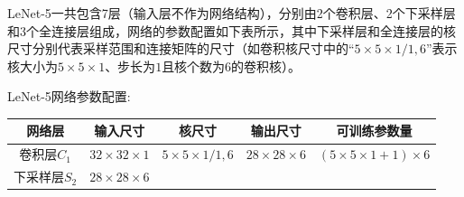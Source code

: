 \documentclass[12pt,a4paper,UTF8,twoside]{book}
\begin{document}
LeNet-5一共包含7层（输入层不作为网络结构），分别由2个卷积层、2个下采样层和3个全连接层组成，网络的参数配置如下表所示，其中下采样层和全连接层的核尺寸分别代表采样范围和连接矩阵的尺寸（如卷积核尺寸中的\(“5\times5\times1/1,6”\)表示核大小为\(5\times5\times1\)、步长为\(1\)且核个数为6的卷积核）。

LeNet-5网络参数配置:

\begin{longtable}[]{@{}ccccc@{}}
\toprule
\begin{minipage}[b]{0.12\columnwidth}\centering
网络层\strut
\end{minipage} & \begin{minipage}[b]{0.16\columnwidth}\centering
输入尺寸\strut
\end{minipage} & \begin{minipage}[b]{0.19\columnwidth}\centering
核尺寸\strut
\end{minipage} & \begin{minipage}[b]{0.16\columnwidth}\centering
输出尺寸\strut
\end{minipage} & \begin{minipage}[b]{0.24\columnwidth}\centering
可训练参数量\strut
\end{minipage}\tabularnewline
\midrule
\endhead
\begin{minipage}[t]{0.12\columnwidth}\centering
卷积层\(C_1\)\strut
\end{minipage} & \begin{minipage}[t]{0.16\columnwidth}\centering
\(32\times32\times1\)\strut
\end{minipage} & \begin{minipage}[t]{0.19\columnwidth}\centering
\(5\times5\times1/1,6\)\strut
\end{minipage} & \begin{minipage}[t]{0.16\columnwidth}\centering
\(28\times28\times6\)\strut
\end{minipage} & \begin{minipage}[t]{0.24\columnwidth}\centering
\((5\times5\times1+1)\times6\)\strut
\end{minipage}\tabularnewline
\begin{minipage}[t]{0.12\columnwidth}\centering
下采样层\(S_2\)\strut
\end{minipage} & \begin{minipage}[t]{0.16\columnwidth}\centering
\(28\times28\times6\)\strut
\end{minipage} & \begin{minipage}[t]{0.19\columnwidth}\centering

\end{minipage}
\end{longtable}
\end{document}
